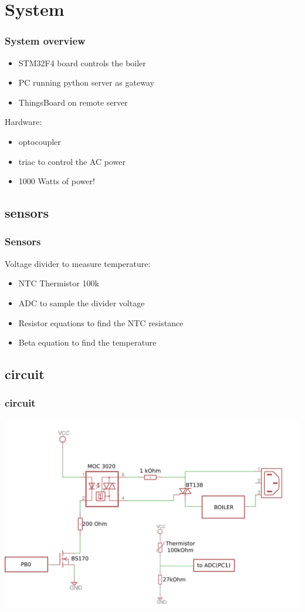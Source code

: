 \documentclass[12pt]{beamer}
\begin{document}
\section{System}
\begin{frame}
    \frametitle{System overview}
    
    \begin{itemize}
        \item STM32F4 board controls the boiler
        \item PC running python server as gateway
        \item ThingsBoard on remote server
    \end{itemize}
    Hardware:
    \begin{itemize}
        \item optocoupler
        \item triac to control the AC power
        \item 1000 Watts of power!
    \end{itemize}

\end{frame}
\subsection{sensors}
\begin{frame}
    \frametitle{Sensors}

    Voltage divider to measure temperature:
    \begin{itemize}
        \item NTC Thermistor 100k
        \item ADC to sample the divider voltage
        \item Resistor equations to find the NTC resistance
        \item Beta equation to find the temperature
    \end{itemize}

\end{frame}
\subsection{circuit}
\begin{frame}
    \frametitle{circuit}
    \includegraphics[width=\textwidth]{eagle.png}
\end{frame}
\end{document}
